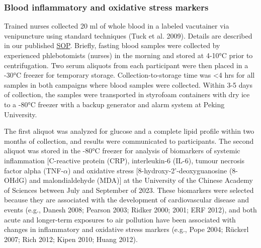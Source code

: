 \documentclass[
  letterpaper,
  DIV=11,
  numbers=noendperiod]{scrartcl}
\begin{document}
\hypertarget{blood-inflammatory-and-oxidative-stress-markers}{%
\subsubsection{Blood inflammatory and oxidative stress
markers}\label{blood-inflammatory-and-oxidative-stress-markers}}

Trained nurses collected 20 ml of whole blood in a labeled vacutainer
via venipuncture using standard techniques (Tuck et al. 2009). Details
are described in our published \href{https://osf.io/zwpfg}{SOP}.
Briefly, fasting blood samples were collected by experienced
phlebotomists (nurses) in the morning and stored at 4-10°C prior to
centrifugation. Two serum aliquots from each participant were then
placed in a -30°C freezer for temporary storage. Collection-to-storage
time was \textless4 hrs for all samples in both campaigns where blood
samples were collected. Within 3-5 days of collection, the samples were
transported in styrofoam containers with dry ice to a -80°C freezer with
a backup generator and alarm system at Peking University.

The first aliquot was analyzed for glucose and a complete lipid profile
within two months of collection, and results were communicated to
participants. The second aliquot was stored in the -80°C freezer for
analysis of biomarkers of systemic inflammation {[}C-reactive protein
(CRP), interleukin-6 (IL-6), tumour necrosis factor alpha
(TNF-\(\alpha\)) and oxidative stress {[}8-hydroxy-2'-deoxyguanosine
(8-OHdG) and malondialdehyde (MDA){]} at the University of the Chinese
Academy of Sciences between July and September of 2023. These biomarkers
were selected because they are associated with the development of
cardiovascular disease and events (e.g., Danesh 2008; Pearson 2003;
Ridker 2000; 2001; ERF 2012), and both acute and longer-term exposures
to air pollution have been associated with changes in inflammatory and
oxidative stress markers (e.g., Pope 2004; Rückerl 2007; Rich 2012;
Kipen 2010; Huang 2012).
\end{document}
